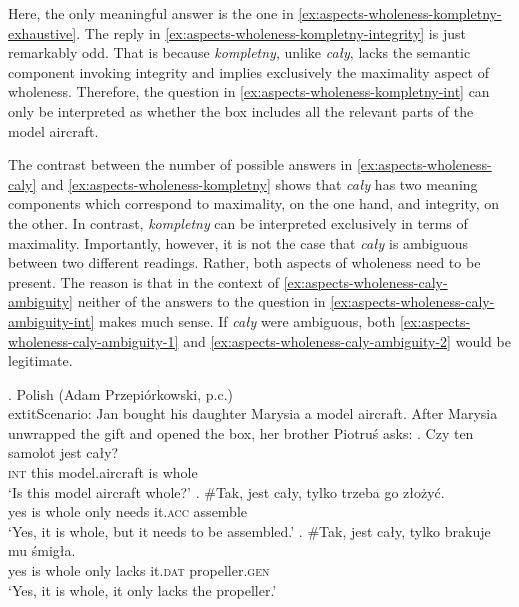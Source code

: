 Here, the only meaningful answer is the one in \ref{ex:aspects-wholeness-kompletny-exhaustive}. The reply in \ref{ex:aspects-wholeness-kompletny-integrity} is just remarkably odd. That is because \textit{kompletny}, unlike \textit{cały}, lacks the semantic component invoking integrity and implies exclusively the maximality aspect of wholeness. Therefore, the question in \ref{ex:aspects-wholeness-kompletny-int} can only be interpreted as whether the box includes all the relevant parts of the model aircraft. 

The contrast between the number of possible answers in \ref{ex:aspects-wholeness-caly} and \ref{ex:aspects-wholeness-kompletny} shows that \textit{cały} has two meaning components which correspond to maximality, on the one hand, and integrity, on the other. In contrast, \textit{kompletny} can be interpreted exclusively in terms of maximality. Importantly, however, it is not the case that \textit{cały} is ambiguous between two different readings. Rather, both aspects of wholeness need to be present. The reason is that in the context of \ref{ex:aspects-wholeness-caly-ambiguity} neither of the answers to the question in \ref{ex:aspects-wholeness-caly-ambiguity-int} makes much sense. If \textit{cały} were ambiguous, both \ref{ex:aspects-wholeness-caly-ambiguity-1} and \ref{ex:aspects-wholeness-caly-ambiguity-2} would be legitimate.

\ex. Polish (Adam Przepiórkowski, p.c.)\\
	extit{Scenario}: Jan bought his daughter Marysia a model aircraft. After Marysia unwrapped the gift and opened the box, her brother Piotruś asks:\label{ex:aspects-wholeness-caly-ambiguity}
\ag. Czy ten samolot jest cały?\label{ex:aspects-wholeness-caly-ambiguity-int}\\
\textsc{int} this model.aircraft is whole\\
`Is this model aircraft whole?'
\bg. \#Tak, jest cały, tylko trzeba go złożyć.\\
yes is whole only needs it\textsc{.acc} assemble\\
`Yes, it is whole, but it needs to be assembled.'\label{ex:aspects-wholeness-caly-ambiguity-1}
\bg. \#Tak, jest cały, tylko brakuje mu śmigła.\\
yes is whole only lacks it\textsc{.dat} propeller\textsc{.gen}\\
`Yes, it is whole, it only lacks the propeller.'\label{ex:aspects-wholeness-caly-ambiguity-2}

